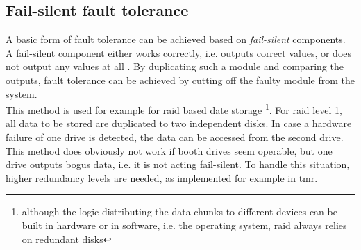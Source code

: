 \subsection{Fail-silent fault tolerance}
A basic form of fault tolerance can be achieved based on \textit{fail-silent} components. A fail-silent component
either works correctly, i.e. outputs correct values, or does not output any values at all \cite{544479}. By duplicating such a module and comparing the
outputs, fault tolerance can be achieved by cutting off the faulty module from the system.
\\
This method is used for example for \gls{raid} based date storage \footnote{although the logic distributing
the data chunks to different devices can be built in hardware or in software, i.e. the operating system, \gls{raid} always relies on redundant disks}.
For \gls{raid} level 1, all data to be stored are duplicated to two independent disks. In case a hardware failure of one drive is detected, the data can be accessed
from the second drive. This method does obviously not work if booth drives seem operable, but one drive outputs bogus data, i.e. it is not acting fail-silent.
To handle this situation, higher redundancy levels are needed, as implemented for example in \gls{tmr}. 

